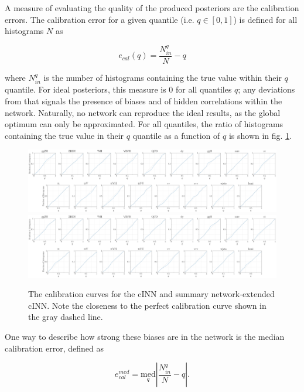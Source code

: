 
A measure of evaluating the quality of the produced posteriors are the calibration errors. The calibration error for a given quantile (i.e. $q\in [0, 1]$) is defined for all histograms $N$ as

\begin{equation*}
	e_{cal}(q) = \frac{N^q_{in}}{N} - q
\end{equation*}

where $N^q_{in}$ is the number of histograms containing the true value within their $q$ quantile. For ideal posteriors, this measure is 0 for all quantiles $q$; any deviations from that signals the presence of biases and of hidden correlations within the network. Naturally, no network can reproduce the ideal results, as the global optimum can only be approximated. For all quantiles, the ratio of histograms containing the true value in their $q$ quantile as a function of $q$ is shown in fig. \ref{fig:ecals}.

\begin{figure}[h!]
	\centering
	\includegraphics[width=\linewidth]{figures/inference/ecal}
	\includegraphics[width=\linewidth]{figures/inference/ecal_SN}
	\caption{The calibration curves for the cINN and summary network-extended cINN. Note the closeness to the perfect calibration curve shown in the gray dashed line.}
	\label{fig:ecals}
\end{figure}

One way to describe how strong these biases are in the network is the median calibration error, defined as

\begin{equation*}
	e^{med}_{cal} = \underset{q}{\text{med}} \left|\frac{N^q_{in}}{N} - q\right|.
\end{equation*}

